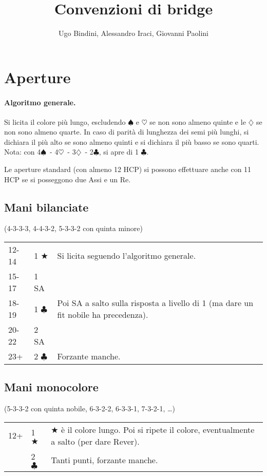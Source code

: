 \documentclass[a4paper,10pt]{article}
\title{Convenzioni di bridge}
\author{Ugo Bindini, Alessandro Iraci, Giovanni Paolini}
\renewcommand{\c}{$\clubsuit$\xspace}
\renewcommand{\d}{$\diamondsuit$\xspace}
\newcommand{\h}{$\heartsuit$\xspace}
\newcommand{\s}{$\spadesuit$\xspace}
\renewcommand{\j}{$\bigstar$\xspace}
\newcommand{\sa}{SA\xspace}
\newcommand{\smallspace}{\vskip0.3cm}
\newenvironment{threecol}
  {\smallspace\noindent\begin{tabular}{l l p{0.78\textwidth}}}
  {\end{tabular}\smallspace}
\begin{document}
\maketitle

\tableofcontents

\pagebreak
\section{Aperture}

\paragraph{Algoritmo generale.}
Si licita il colore più lungo, escludendo \s e \h se non sono almeno quinte e le \d se non sono almeno quarte.
In caso di parità di lunghezza dei semi più lunghi, si dichiara il più alto se sono almeno quinti e si dichiara il più basso se sono quarti.
Nota: con 4\s\ - 4\h\ - 3\d\ - 2\c, si apre di 1 \c.

\noindent Le aperture standard (con almeno 12 HCP) si possono effettuare anche con 11 HCP se si posseggono due Assi e un Re.

\subsection{Mani bilanciate}
(4-3-3-3, 4-4-3-2, 5-3-3-2 con quinta minore)
\smallspace

\begin{threecol}
 12-14 & 1 \j & Si licita seguendo l'algoritmo generale. \\
 15-17 & 1 \sa & \\
 18-19 & 1 \c & Poi \sa a salto sulla risposta a livello di 1 (ma dare un fit nobile ha precedenza). \\
 20-22 & 2 \sa & \\
 23+ & 2 \c & Forzante manche. \\
\end{threecol}


\subsection{Mani monocolore}
(5-3-3-2 con quinta nobile, 6-3-2-2, 6-3-3-1, 7-3-2-1, \dots)

\begin{threecol}
 12+ & 1 \j & \j è il colore lungo. Poi si ripete il colore, eventualmente a salto (per dare Rever).\\
 & 2 \c & Tanti punti, forzante manche.
\end{threecol}
\end{document}
